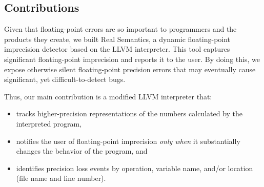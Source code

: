 \subsection{Contributions}

Given that floating-point errors are so important to programmers and the products they create, we built Real Semantics, a dynamic floating-point imprecision detector based on the LLVM interpreter. This tool captures significant floating-point imprecision and reports it to the user. By doing this, we expose otherwise silent floating-point precision errors that may eventually cause significant, yet difficult-to-detect bugs.

Thus, our main contribution is a modified LLVM interpreter that:

\begin{itemize}
\item tracks higher-precision representations of the numbers calculated by the interpreted program,
\item notifies the user of floating-point imprecision \emph{only when} it substantially changes the behavior of the program, and
\item identifies precision loss events by operation, variable name, and/or location (file name and line number).
\end{itemize}
